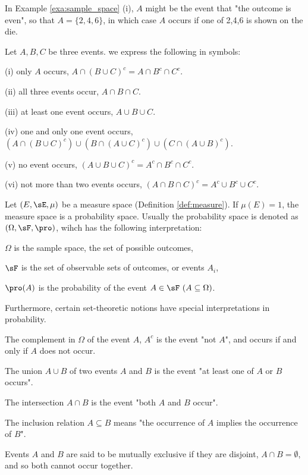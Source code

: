 \begin{remark}
In Example \ref{exa:sample_space} (i), $A$ might be the event that "the outcome is even", so that $A = \{2,4,6\}$, in which case $A$ occurs if one of 2,4,6 is shown on the die.
\end{remark}

\begin{example}
Let $A,B,C$ be three events. we express the following in symbols:
\ben
\item [(i)] only $A$ occurs, $A\cap(B\cup C)^c=A\cap B^c\cap C^c$.
\item [(ii)] all three events occur, $A\cap B\cap C$.
\item [(iii)] at least one event occurs, $A\cup B\cup C$.
\item [(iv)] one and only one event occurs, $(A\cap(B\cup C)^c) \cup (B\cap(A\cup C)^c) \cup (C\cap(A\cup B)^c)$.
\item [(v)] no event occurs, $(A \cup B \cup C)^c = A^c \cap B^c \cap C^c$.
\item [(vi)] not more than two events occurs, $(A \cap B \cap C)^c = A^c \cup B^c \cup C^c$.
\een
\end{example}


\begin{definition}\label{def:probability_space}
Let $(E,\sE,\mu)$ be a measure space (Definition \ref{def:measure}). If $\mu(E)=1$, the measure space is a probability space. Usually the probability space is denoted as
$(\Omega, \sF, \pro)$, wihch has the following interpretation: \bit
\item $\Omega$ is the sample space, the set of possible outcomes,
\item $\sF$ is the set of observable sets of outcomes, or events $A_i$,
\item $\pro(A)$ is the probability of the event $A\in \sF\ (A\subseteq \Omega)$.
\eit
\end{definition}

\begin{definition}
Furthermore, certain set-theoretic notions have special interpretations in probability.

\bit
\item The complement in $\Omega$ of the event $A$, $A^c$ is the event "not $A$", and occurs if and only if $A$ does not occur.
\item The union $A \cup B$ of two events $A$ and $B$ is the event "at least one of $A$ or $B$ occurs".
\item The intersection $A \cap B$ is the event "both $A$ and $B$ occur".
\item The inclusion relation $A \subseteq B$ means "the occurrence of $A$ implies the occurrence of $B$".
\item Events $A$ and $B$ are said to be mutually exclusive if they are disjoint, $A \cap B = \emptyset$, and so both cannot occur together.
\eit
\end{definition}

